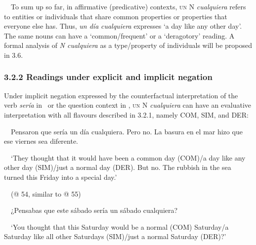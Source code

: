 \begin{styleStandard}
\ \ To sum up so far, in affirmative (predicative) contexts, \textsc{un} N \textit{cualquiera} refers to entities or individuals that share common properties or properties that everyone else has. Thus, \textit{un día} \textit{cualquiera} expresses ‘a day like any other day’. The same nouns can have a ‘common/frequent’ or a ‘deragotory’ reading. A formal analysis of \textit{N cualquiera} as a type/property of individuals will be proposed in 3.6.
\end{styleStandard}

\subsubsection[3.2.2 Readings under explicit and implicit negation]{\textbf{3.2.2 Readings under explicit and implicit negation}}
\begin{styleStandard}
Under implicit negation expressed by the counterfactual interpretation of the verb \textit{sería} in \ or the question context in , \textsc{un} N \textit{cualquiera} can have an evaluative interpretation with all flavours described in 3.2.1, namely COM, SIM, and DER:
\end{styleStandard}

\begin{styleStandard}
\label{bkm:Ref54634548}\ \ Pensaron que sería un día cualquiera. Pero no. La basura en el mar hizo que ese viernes sea diferente.
\end{styleStandard}

\begin{styleStandard}
\ \ ‘They thought that it would have been a common day (COM)/a day like any other day (SIM)/just a normal day (DER). But no. The rubbish in the sea turned this Friday into a special day.’
\end{styleStandard}

\begin{styleStandard}
\ \ (@ 54, similar to @ 55)
\end{styleStandard}

\begin{styleStandard}
\label{bkm:Ref54634539}\ \ ¿Pensabas que este sábado sería un sábado cualquiera?
\end{styleStandard}

\begin{styleStandard}
\ \ ‘You thought that this Saturday would be a normal (COM) Saturday/a Saturday like all other Saturdays (SIM)/just a normal Saturday (DER)?’
\end{styleStandard}

